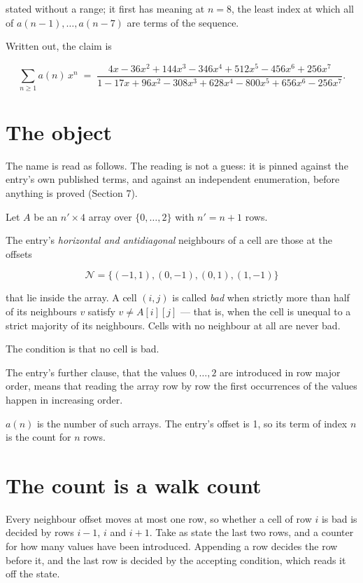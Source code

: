 \documentclass[11pt]{article}
\theoremstyle{definition}
\begin{document}
stated without a range; it first has meaning at $n = 8$, the least index at which all of $a(n-1),\dots,a(n-7)$ are terms of the sequence.

Written out, the claim is

\[\sum_{n \ge 1} a(n)\,x^n \;=\; \frac{4x - 36x^{2} + 144x^{3} - 346x^{4} + 512x^{5} - 456x^{6} + 256x^{7}}{1 - 17x + 96x^{2} - 308x^{3} + 628x^{4} - 800x^{5} + 656x^{6} - 256x^{7}}.\]

\section{The object}

The name is read as follows. The reading is not a guess: it is pinned against the entry's own published terms, and against an independent enumeration, before anything is proved (Section 7).

Let $A$ be an $n' \times 4$ array over $\{0,\dots,2\}$ with $n' = n + 1$ rows.

The entry's {\itshape horizontal and antidiagonal} neighbours of a cell are those at the offsets

\[\mathcal{N} = \{(-1,1), (0,-1), (0,1), (1,-1)\}\]

that lie inside the array. A cell $(i,j)$ is called {\itshape bad} when strictly more than half of its neighbours $v$ satisfy $v \ne A[i][j]$ --- that is, when the cell is unequal to a strict majority of its neighbours. Cells with no neighbour at all are never bad.

The condition is that no cell is bad.

The entry's further clause, that the values $0,\dots,2$ are introduced in row major order, means that reading the array row by row the first occurrences of the values happen in increasing order.

$a(n)$ is the number of such arrays. The entry's offset is 1, so its term of index $n$ is the count for $n$ rows.

\section{The count is a walk count}

Every neighbour offset moves at most one row, so whether a cell of row $i$ is bad is decided by rows $i-1$, $i$ and $i+1$. Take as state the last two rows, and a counter for how many values have been introduced. Appending a row decides the row before it, and the last row is decided by the accepting condition, which reads it off the state.
\end{document}
